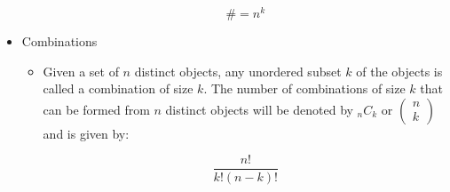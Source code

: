 \begin{itemize}
\begin{itemize}
        $$\#=n^k$$

    \end{itemize}

  \item Combinations

    \begin{itemize}

      \item Given a set of $n$ distinct objects, any unordered subset $k$ of the objects is called a combination of size $k$. The number of combinations of size $k$ that can be formed from $n$ distinct objects will be denoted by $_nC_k$ or $\left( \begin{matrix} n\\k\end{matrix} \right)$ and is given by:

        $$\frac{n!}{k!(n-k)!}$$

    \end{itemize}

\end{itemize}



